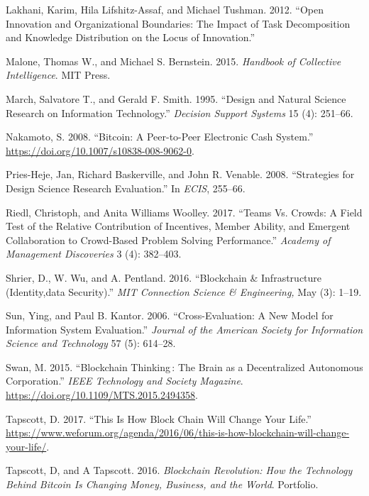 \documentclass[]{elsarticle} %
\begin{document}
\hypertarget{ref-lakhani_open_2012}{}
Lakhani, Karim, Hila Lifshitz-Assaf, and Michael Tushman. 2012. ``Open
Innovation and Organizational Boundaries: The Impact of Task
Decomposition and Knowledge Distribution on the Locus of Innovation.''

\hypertarget{ref-malone_handbook_2015}{}
Malone, Thomas W., and Michael S. Bernstein. 2015. \emph{Handbook of
Collective Intelligence}. MIT Press.

\hypertarget{ref-march_design_1995}{}
March, Salvatore T., and Gerald F. Smith. 1995. ``Design and Natural
Science Research on Information Technology.'' \emph{Decision Support
Systems} 15 (4): 251--66.

\hypertarget{ref-nakamoto_bitcoin:_2008}{}
Nakamoto, S. 2008. ``Bitcoin: A Peer-to-Peer Electronic Cash System.''
\url{https://doi.org/10.1007/s10838-008-9062-0}.

\hypertarget{ref-pries-heje_strategies_2008}{}
Pries-Heje, Jan, Richard Baskerville, and John R. Venable. 2008.
``Strategies for Design Science Research Evaluation.'' In \emph{ECIS},
255--66.

\hypertarget{ref-riedl_teams_2017}{}
Riedl, Christoph, and Anita Williams Woolley. 2017. ``Teams Vs. Crowds:
A Field Test of the Relative Contribution of Incentives, Member Ability,
and Emergent Collaboration to Crowd-Based Problem Solving Performance.''
\emph{Academy of Management Discoveries} 3 (4): 382--403.

\hypertarget{ref-shrier_blockchain_2016}{}
Shrier, D., W. Wu, and A. Pentland. 2016. ``Blockchain \& Infrastructure
(Identity,data Security).'' \emph{MIT Connection Science \&
Engineering,} May (3): 1--19.

\hypertarget{ref-sun_cross-evaluation:_2006}{}
Sun, Ying, and Paul B. Kantor. 2006. ``Cross-Evaluation: A New Model for
Information System Evaluation.'' \emph{Journal of the American Society
for Information Science and Technology} 57 (5): 614--28.

\hypertarget{ref-swan_blockchain_2015}{}
Swan, M. 2015. ``Blockchain Thinking\,: The Brain as a Decentralized
Autonomous Corporation.'' \emph{IEEE Technology and Society Magazine}.
\url{https://doi.org/10.1109/MTS.2015.2494358}.

\hypertarget{ref-tapscott_this_2017}{}
Tapscott, D. 2017. ``This Is How Block Chain Will Change Your Life.''
\url{https://www.weforum.org/agenda/2016/06/this-is-how-blockchain-will-change-your-life/}.

\hypertarget{ref-tapscott_blockchain_2016}{}
Tapscott, D, and A Tapscott. 2016. \emph{Blockchain Revolution: How the
Technology Behind Bitcoin Is Changing Money, Business, and the World}.
Portfolio.
\end{document}
